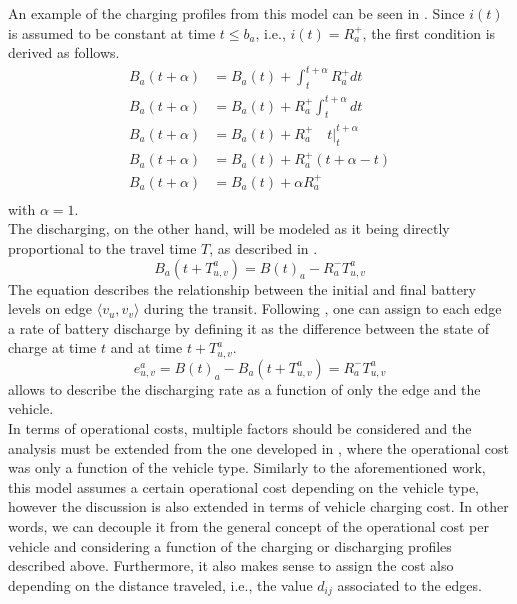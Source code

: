 	An example of the charging profiles from this model can be seen in . 
	 Since $i(t)$ is assumed to be constant at time $t\leq b_a$, i.e., $i(t) = R^+_a$, the first condition is derived as follows. 
\begin{align*}
	B_a(t+\alpha) &= B_a(t) + \int_{t}^{t+\alpha}R^+_adt\\
	B_a(t+\alpha) &= B_a(t) +R^+_a \int_{t}^{t+\alpha}dt\\
	B_a(t+\alpha) &= B_a(t) +R^+_a \quad t \bigg|_{t}^{t+\alpha}\\
	B_a(t+\alpha) &= B_a(t) +R^+_a (t+\alpha - t)\\
	B_a(t+\alpha) &= B_a(t) +\alpha R^+_a\\
\end{align*}
with $\alpha = 1$. \\
The discharging, on the other hand, will be modeled as it being directly proportional to the travel time $T$, as described in . 
\begin{equation}
	B_a(t+T_{u,v}^a) = B(t)_a - R^-_a T_{u,v}^a
	\label{eq:discharging}
\end{equation} 
The equation describes the relationship between the initial and final battery levels on edge $\langle v_u, v_v \rangle$ during the transit. Following , one can assign to each edge a rate of battery discharge by defining it as the difference between the state of charge at time $t$ and at time $t+T_{u,v}^a$. \\
\begin{equation}
	 e^a_{u,v} = B(t)_a - B_a(t+T_{u,v}^a) =  R^-_a T_{u,v}^a
	\label{eq:discharging_rate_per_edge}
\end{equation} 
 allows to describe the discharging rate as a function of only the edge and the vehicle. \\
In terms of operational costs, multiple factors should be considered and the analysis must be extended from the one developed in \cite{project_thesis}, where the operational cost was only a function of the vehicle type. Similarly to the aforementioned work, this model assumes a certain operational cost depending on the vehicle type, however the discussion is also extended in terms of vehicle charging cost. In other words, we can decouple it from the general concept of the operational cost per vehicle and considering a function of the charging or discharging profiles described above. Furthermore, it also makes sense to assign the cost also depending on the distance traveled, i.e., the value $d_{ij}$ associated to the edges. \\
